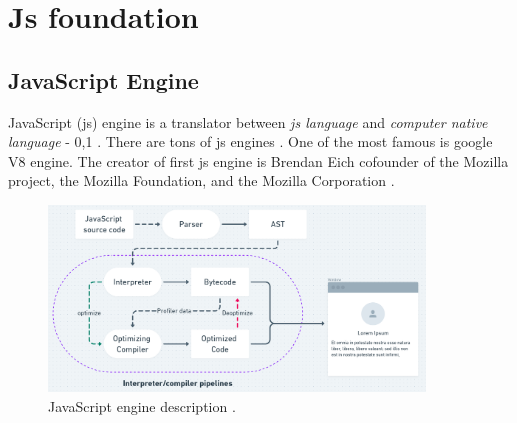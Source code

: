 \chapter{Js foundation}

\section{JavaScript Engine}

    JavaScript (\acrshort{js}) engine is a translator between \textit{\acrshort{js} language} and \textit{computer native language} - 0,1  \cite{JavaScriptEngineImage2020}.
    There are tons of \acrshort{js} engines \cite{ECMAScriptEngines}. One of the most famous is google V8 engine. 
    The creator of first \acrshort{js} engine is Brendan Eich cofounder of the Mozilla project, the Mozilla Foundation, and the Mozilla Corporation \cite{BrendanEich}.


    
    \begin{figure}[h]
        \begin{center}
            \includegraphics[width=10cm]{01/images/01-js-engine.png}
            \caption[JavaScript engine]{JavaScript engine description  \cite{JavaScriptEngineImage2020}.}
        \end{center}
    \end{figure}

   
